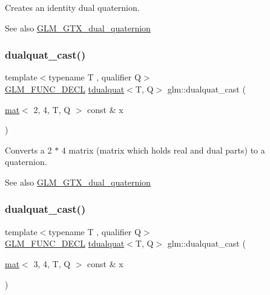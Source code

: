Creates an identity dual quaternion.

\begin{DoxySeeAlso}{See also}
\hyperlink{group__gtx__dual__quaternion}{G\+L\+M\+\_\+\+G\+T\+X\+\_\+dual\+\_\+quaternion} 
\end{DoxySeeAlso}
\mbox{\label{group__gtx__dual__quaternion_gac4064ff813759740201765350eac4236}} 
\subsubsection{\texorpdfstring{dualquat\+\_\+cast()}{dualquat\_cast()}\hspace{0.1cm}{\footnotesize\ttfamily [1/2]}}
{\footnotesize\ttfamily template$<$typename T , qualifier Q$>$ \\
\hyperlink{setup_8hpp_ab2d052de21a70539923e9bcbf6e83a51}{G\+L\+M\+\_\+\+F\+U\+N\+C\+\_\+\+D\+E\+CL} \hyperlink{structglm_1_1tdualquat}{tdualquat}$<$T, Q$>$ glm\+::dualquat\+\_\+cast (\begin{DoxyParamCaption}\item[{\hyperlink{structglm_1_1mat}{mat}$<$ 2, 4, T, Q $>$ const \&}]{x }\end{DoxyParamCaption})}

Converts a 2 $\ast$ 4 matrix (matrix which holds real and dual parts) to a quaternion.

\begin{DoxySeeAlso}{See also}
\hyperlink{group__gtx__dual__quaternion}{G\+L\+M\+\_\+\+G\+T\+X\+\_\+dual\+\_\+quaternion} 
\end{DoxySeeAlso}
\mbox{\label{group__gtx__dual__quaternion_ga91025ebdca0f4ea54da08497b00e8c84}} 
\subsubsection{\texorpdfstring{dualquat\+\_\+cast()}{dualquat\_cast()}\hspace{0.1cm}{\footnotesize\ttfamily [2/2]}}
{\footnotesize\ttfamily template$<$typename T , qualifier Q$>$ \\
\hyperlink{setup_8hpp_ab2d052de21a70539923e9bcbf6e83a51}{G\+L\+M\+\_\+\+F\+U\+N\+C\+\_\+\+D\+E\+CL} \hyperlink{structglm_1_1tdualquat}{tdualquat}$<$T, Q$>$ glm\+::dualquat\+\_\+cast (\begin{DoxyParamCaption}\item[{\hyperlink{structglm_1_1mat}{mat}$<$ 3, 4, T, Q $>$ const \&}]{x }\end{DoxyParamCaption})}

